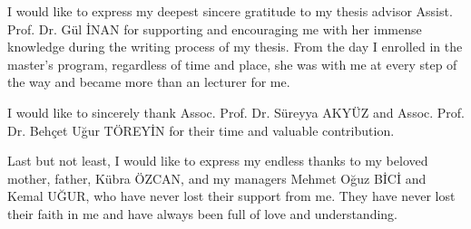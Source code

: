 I would like to express my deepest sincere gratitude to my thesis advisor Assist. Prof. Dr. Gül İNAN for supporting and encouraging me with her immense knowledge during the writing process of my thesis. From the day I enrolled in the master's program, regardless of time and place, she was with me at every step of the way and became more than an lecturer for me.

I would like to sincerely thank Assoc. Prof. Dr. Süreyya AKYÜZ and Assoc. Prof. Dr. Behçet Uğur TÖREYİN for their time and valuable contribution.

Last but not least, I would like to express my endless thanks to my beloved mother, father, Kübra ÖZCAN, and my managers Mehmet Oğuz BİCİ and Kemal UĞUR, who have never lost their support from me. They have never lost their faith in me and have always been full of love and understanding.